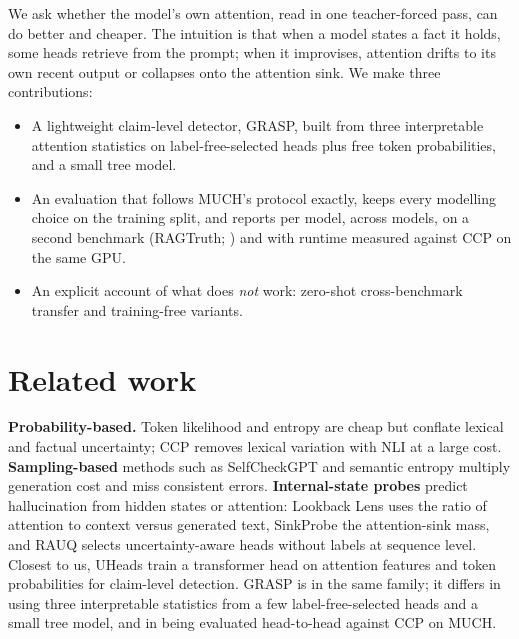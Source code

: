 \documentclass[11pt]{article}
\begin{document}
We ask whether the model's own attention, read in one teacher-forced pass, can do better and
cheaper. The intuition is that when a model states a fact it holds, some heads retrieve from the
prompt; when it improvises, attention drifts to its own recent output or collapses onto the
attention sink. We make three contributions:
\begin{itemize}
  \item A lightweight claim-level detector, GRASP, built from three interpretable attention
        statistics on label-free-selected heads plus free token probabilities, and a small tree model.
  \item An evaluation that follows MUCH's protocol exactly, keeps every modelling choice on the
        training split, and reports per model, across models, on a second benchmark (RAGTruth;
        \citealp{niu-etal-2024-ragtruth}) and with runtime measured against CCP on the same GPU.
  \item An explicit account of what does \emph{not} work: zero-shot cross-benchmark transfer and
        training-free variants.
\end{itemize}

\section{Related work}
\textbf{Probability-based.} Token likelihood and entropy are cheap but conflate lexical and factual
uncertainty; CCP \citep{fadeeva-etal-2024-fact} removes lexical variation with NLI at a large
cost. \textbf{Sampling-based} methods such as SelfCheckGPT \citep{manakul-etal-2023-selfcheckgpt}
and semantic entropy \citep{kuhn2023semanticuncertaintylinguisticinvariances} multiply generation
cost and miss consistent errors. \textbf{Internal-state probes} predict hallucination from hidden
states \citep{azaria2023internalstatellmknows,chen2024insidellmsinternalstates} or attention:
Lookback Lens \citep{chuang2024lookbacklensdetectingmitigating} uses the ratio of attention to
context versus generated text, SinkProbe \citep{binkowski2026attentionsinksinternalsignals} the
attention-sink mass, and RAUQ \citep{vazhentsev2026efficienthallucinationdetectionllms} selects
uncertainty-aware heads without labels at sequence level. Closest to us, UHeads
\citep{shelmanov-etal-2025-head} train a transformer head on attention features and token
probabilities for claim-level detection. GRASP is in the same family; it differs in using three
interpretable statistics from a few label-free-selected heads and a small tree model, and in being
evaluated head-to-head against CCP on MUCH.
\end{document}
